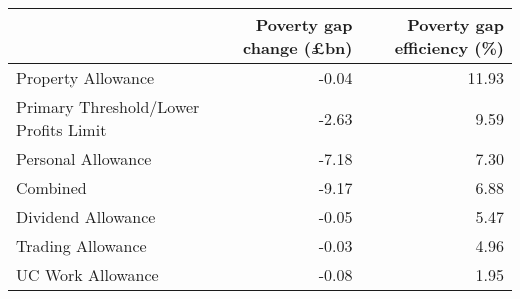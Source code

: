 \begin{tabular}{lrr}
\toprule
{} &  Poverty gap change (£bn) &  Poverty gap efficiency (\%) \\
\midrule
Property Allowance                    &                     -0.04 &                       11.93 \\
Primary Threshold/Lower Profits Limit &                     -2.63 &                        9.59 \\
Personal Allowance                    &                     -7.18 &                        7.30 \\
Combined                              &                     -9.17 &                        6.88 \\
Dividend Allowance                    &                     -0.05 &                        5.47 \\
Trading Allowance                     &                     -0.03 &                        4.96 \\
UC Work Allowance                     &                     -0.08 &                        1.95 \\
\bottomrule
\end{tabular}
